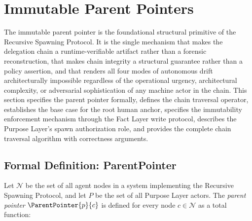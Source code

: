 \section{Immutable Parent Pointers}
\label{sec:rs-immutable-parent-pointers}

The immutable parent pointer is the foundational structural primitive of the Recursive Spawning Protocol. It is the single mechanism that makes the delegation chain a runtime-verifiable artifact rather than a forensic reconstruction, that makes chain integrity a structural guarantee rather than a policy assertion, and that renders all four modes of autonomous drift architecturally impossible regardless of the operational urgency, architectural complexity, or adversarial sophistication of any machine actor in the chain. This section specifies the parent pointer formally, defines the chain traversal operator, establishes the base case for the root human anchor, specifies the immutability enforcement mechanism through the Fact Layer write protocol, describes the Purpose Layer's spawn authorization role, and provides the complete chain traversal algorithm with correctness arguments.

\subsection{Formal Definition: ParentPointer}
\label{sec:rs-parent-pointer-formal}

Let $\mathcal{N}$ be the set of all agent nodes in a \bxthree{} system implementing the Recursive Spawning Protocol, and let $P$ be the set of all Purpose Layer actors. The \emph{parent pointer} $\ParentPointer{p}{c}$ is defined for every node $c \in \mathcal{N}$ as a total function:

